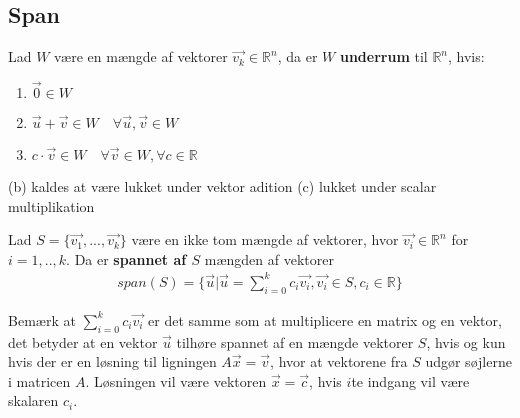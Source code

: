 \subsection{Span}
\begin{defn}
Lad $W$ være en mængde af vektorer $\vec{v_k} \in \mathds{R}^n$, da er $W$  \textbf{underrum} til $\mathds{R}^n$, hvis:
\begin{enumerate}[label=\alph*]
\item $\vec{0} \in W$
\item $\vec{u}+\vec{v} \in W \quad \forall \vec{u}, \vec{v} \in W$
\item $c \cdot \vec{v} \in W \quad \forall \vec{v} \in W, \forall c \in \mathds{R}$
\end{enumerate}
\end{defn}
(b) kaldes at være lukket under vektor adition (c) lukket under scalar multiplikation

\begin{defn}[Span]
Lad $S=\{\vec{v_1},...,\vec{v_k}\}$ være en ikke tom mængde af vektorer, hvor $\vec{v_i} \in \mathds{R}^n$ for $i = 1,..,k$. 
Da er \textbf{spannet af $S$} mængden af vektorer
\begin{align*}
span(S) = \{\vec{u}| \vec{u}=\sum_{i=0}^k c_i \vec{v_i}, \vec{v_i} \in S, c_i \in \mathds{R}\}
\end{align*} 
\label{def:span}
\end{defn}
Bemærk at $\sum_{i=0}^k c_i \vec{v_i}$ er det samme som at multiplicere en matrix og en vektor, det betyder at en vektor $\vec{u}$ tilhøre spannet af en mængde vektorer $S$, hvis og kun hvis der er en løsning til ligningen $A\vec{x} = \vec{v}$, hvor at vektorene fra $S$ udgør søjlerne i matricen $A$.
Løsningen vil være vektoren $\vec{x}=\vec{c}$, hvis $i$te indgang vil være skalaren $c_i$.

